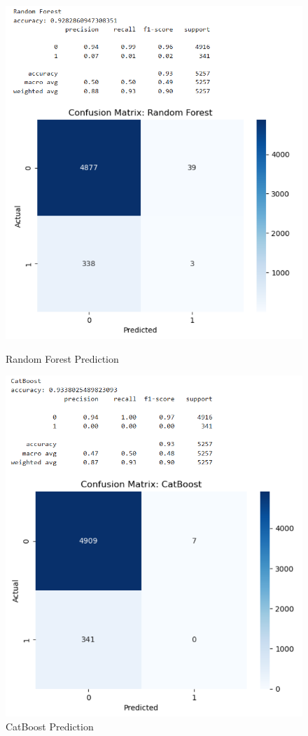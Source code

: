 \documentclass{article}
\begin{document}
\begin{figure}[h!]
	\vspace{0.5cm} %
	
	\begin{minipage}{0.48\textwidth}
		\centering
		\includegraphics[width=0.7\linewidth]{../Image/P49.jpg}
		\caption{Random Forest Prediction}
		\label{fig:P49}
	\end{minipage}\hfill
	\begin{minipage}{0.48\textwidth}
		\centering
		\includegraphics[width=0.7\linewidth]{../Image/P50.jpg}
		\caption{CatBoost Prediction}
		\label{fig:P50}
	\end{minipage}
\end{figure}
\end{document}

